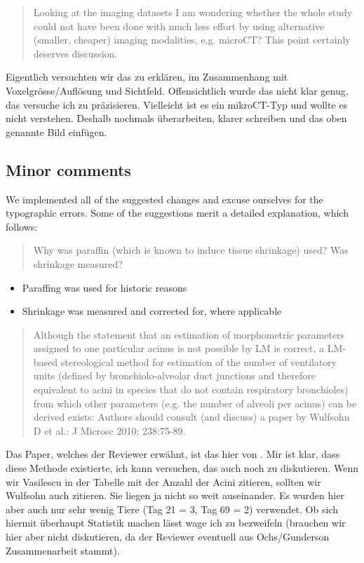 \documentclass[english,paper=a4]{scrartcl}
\begin{document}
\blockquote{Looking at the imaging datasets I am wondering whether the whole study could  not have been done with much less effort by using alternative (smaller, cheaper) imaging modalities, e.g. microCT? This point certainly 
deserves discussion.}

Eigentlich versuchten wir das zu erklären, im Zusammenhang mit Voxelgrösse/Auflösung und Sichtfeld. Offensichtlich wurde das nicht klar genug, das versuche ich zu präzisieren.
Vielleicht ist es ein mikroCT-Typ und wollte es nicht verstehen. Deshalb nochmals überarbeiten, klarer schreiben und das oben genannte Bild einfügen.
 
\subsection{Minor comments}
We implemented all of the suggested changes and excuse ourselves for the typographic errors. Some of the suggestions merit a detailed explanation, which follows:

\blockquote{Why was paraffin (which is known to induce tissue shrinkage) used? Was shrinkage measured?}
\begin{itemize}
	\item Paraffing was used for historic reasons
	\item Shrinkage was measured and corrected for, where applicable
\end{itemize}

\blockquote{Although the statement that an estimation of morphometric parameters assigned to one particular acinus is not possible by LM is correct, a LM-based stereological method for estimation of the number of ventilatory units (defined by bronchiolo-alveolar duct junctions and therefore equivalent to acini in species that do not contain respiratory bronchioles) from which other parameters (e.g. the number of alveoli per acinus) can be derived exists: Authors should consult (and discuss) a paper by Wulfsohn D et al.: J Microsc 2010; 238:75-89.}

Das Paper, welches der Reviewer erwähnt, ist das hier von \citet{Wulfsohn2010}.
Mir ist klar, dass diese Methode existierte, ich kann versuchen, das auch noch zu diskutieren.
Wenn wir Vasilescu in der Tabelle mit der Anzahl der Acini zitieren, sollten wir Wulfsohn auch zitieren. Sie liegen ja nicht so weit auseinander. Es wurden hier aber auch nur sehr wenig Tiere (Tag 21 = 3, Tag 69 = 2) verwendet. Ob sich hiermit überhaupt Statistik machen lässt wage ich zu bezweifeln (brauchen wir hier aber nicht diskutieren, da der Reviewer eventuell aus Ochs/Gunderson Zusammenarbeit stammt).
\end{document}
